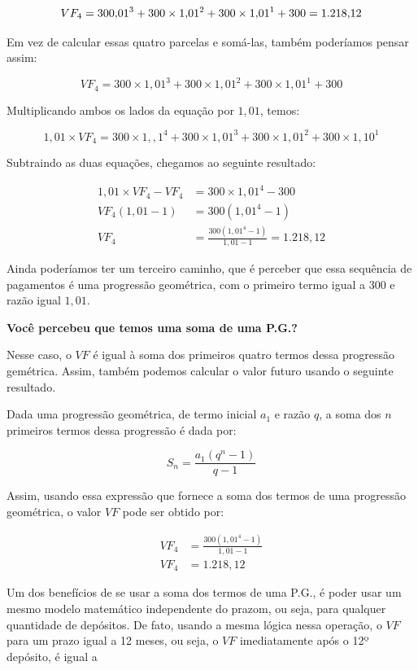 $$VF_4=300\time1{,}01^3+300\times1{,}01^2+300\times1{,}01^1+300=1.218{,}12$$

Em vez de calcular essas quatro parcelas e somá-las, também poderíamos pensar assim:

\begin{equation*}
VF_4=300\times1{,}01^3+300\times1{,}01^2+300\times1{,}01^1+300
\end{equation*}

Multiplicando ambos os lados da equação por $1{,}01$, temos:

\begin{equation*}
1{,}01\times VF_4=300\times1,{,}1^4+300\times1{,}01^3+300\times 1,01^2+300\times1{,}10^1
\end{equation*}

Subtraindo as duas equações, chegamos ao seguinte resultado:

\begin{align*}
1{,}01\times VF_4-VF_4&=300\times1{,}01^4-300\\
VF_4(1{,}01-1)&=300(1{,}01^4-1)\\
VF_4&=\frac{300(1{,}01^4-1)}{1{,}01-1}=1.218{,}12
\end{align*}

Ainda poderíamos ter um terceiro caminho, que é perceber que essa sequência de pagamentos é uma progressão geométrica, com o primeiro termo igual a $300$ e razão igual $1{,}01$.

\textbf{Você percebeu que temos uma soma de uma P.G.?}

Nesse caso, o $VF$ é igual à soma dos primeiros quatro termos dessa progressão gemétrica. Assim, também podemos calcular o valor futuro usando o seguinte resultado.

Dada uma progressão geométrica, de termo inicial $a_1$ e razão $q$, a soma dos $n$ primeiros termos dessa progressão é dada por:

\begin{equation*}
S_n=\frac{a_1(q^n-1)}{q-1}
\end{equation*}
 
Assim, usando essa expressão que fornece a soma dos termos de uma progressão geométrica, o valor $VF$ pode ser obtido por:

\begin{align*}
VF_4&=\frac{300(1{,}01^4-1)}{1{,}01-1}\\
VF_4&=1.218{,}12
\end{align*}

Um dos benefícios de se usar a soma dos termos de uma P.G., é poder usar um mesmo modelo matemático independente do prazom, ou seja, para qualquer quantidade de depósitos. De fato, usando a mesma lógica nessa operação, o $VF$ para um prazo igual a 12 meses, ou seja, o $VF$ imediatamente após o 12º depósito, é igual a

